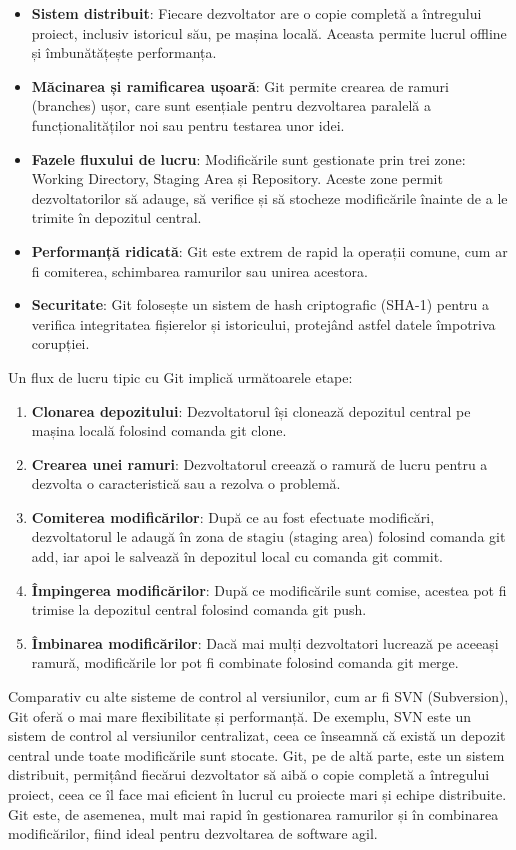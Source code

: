 \documentclass[titlepage,12pt]{article}
\DeclareRobustCommand{\code}[1]{{\ttfamily\small #1}}
\begin{document}
\begin{itemize}
\item \textbf{Sistem distribuit}: Fiecare dezvoltator are o copie completă a întregului proiect, inclusiv istoricul său, pe mașina locală. Aceasta permite lucrul offline și îmbunătățește performanța.
\item \textbf{Măcinarea și ramificarea ușoară}: Git permite crearea de ramuri (branches) ușor, care sunt esențiale pentru dezvoltarea paralelă a funcționalităților noi sau pentru testarea unor idei.
\item \textbf{Fazele fluxului de lucru}: Modificările sunt gestionate prin trei zone: Working Directory, Staging Area și Repository. Aceste zone permit dezvoltatorilor să adauge, să verifice și să stocheze modificările înainte de a le trimite în depozitul central.
\item \textbf{Performanță ridicată}: Git este extrem de rapid la operații comune, cum ar fi comiterea, schimbarea ramurilor sau unirea acestora.
\item \textbf{Securitate}: Git folosește un sistem de hash criptografic (SHA-1) pentru a verifica integritatea fișierelor și istoricului, protejând astfel datele împotriva corupției.
\end{itemize}

Un flux de lucru tipic cu Git implică următoarele etape:
\begin{enumerate}
\item \textbf{Clonarea depozitului}: Dezvoltatorul își clonează depozitul central pe mașina locală folosind comanda \code{git clone}.
\item \textbf{Crearea unei ramuri}: Dezvoltatorul creează o ramură de lucru pentru a dezvolta o caracteristică sau a rezolva o problemă.
\item \textbf{Comiterea modificărilor}: După ce au fost efectuate modificări, dezvoltatorul le adaugă în zona de stagiu (staging area) folosind comanda \code{git add}, iar apoi le salvează în depozitul local cu comanda \code{git commit}.
\item \textbf{Împingerea modificărilor}: După ce modificările sunt comise, acestea pot fi trimise la depozitul central folosind comanda \code{git push}.
\item \textbf{Îmbinarea modificărilor}: Dacă mai mulți dezvoltatori lucrează pe aceeași ramură, modificările lor pot fi combinate folosind comanda \code{git merge}.
\end{enumerate}

Comparativ cu alte sisteme de control al versiunilor, cum ar fi SVN (Subversion), Git oferă o mai mare flexibilitate și performanță. De exemplu, SVN este un sistem de control al versiunilor centralizat, ceea ce înseamnă că există un depozit central unde toate modificările sunt stocate. Git, pe de altă parte, este un sistem distribuit, permițând fiecărui dezvoltator să aibă o copie completă a întregului proiect, ceea ce îl face mai eficient în lucrul cu proiecte mari și echipe distribuite. Git este, de asemenea, mult mai rapid în gestionarea ramurilor și în combinarea modificărilor, fiind ideal pentru dezvoltarea de software agil.
\end{document}
